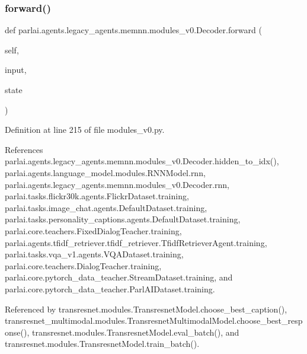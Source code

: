 \subsubsection{\texorpdfstring{forward()}{forward()}}
{\footnotesize\ttfamily def parlai.\+agents.\+legacy\+\_\+agents.\+memnn.\+modules\+\_\+v0.\+Decoder.\+forward (\begin{DoxyParamCaption}\item[{}]{self,  }\item[{}]{input,  }\item[{}]{state }\end{DoxyParamCaption})}



Definition at line 215 of file modules\+\_\+v0.\+py.



References parlai.\+agents.\+legacy\+\_\+agents.\+memnn.\+modules\+\_\+v0.\+Decoder.\+hidden\+\_\+to\+\_\+idx(), parlai.\+agents.\+language\+\_\+model.\+modules.\+R\+N\+N\+Model.\+rnn, parlai.\+agents.\+legacy\+\_\+agents.\+memnn.\+modules\+\_\+v0.\+Decoder.\+rnn, parlai.\+tasks.\+flickr30k.\+agents.\+Flickr\+Dataset.\+training, parlai.\+tasks.\+image\+\_\+chat.\+agents.\+Default\+Dataset.\+training, parlai.\+tasks.\+personality\+\_\+captions.\+agents.\+Default\+Dataset.\+training, parlai.\+core.\+teachers.\+Fixed\+Dialog\+Teacher.\+training, parlai.\+agents.\+tfidf\+\_\+retriever.\+tfidf\+\_\+retriever.\+Tfidf\+Retriever\+Agent.\+training, parlai.\+tasks.\+vqa\+\_\+v1.\+agents.\+V\+Q\+A\+Dataset.\+training, parlai.\+core.\+teachers.\+Dialog\+Teacher.\+training, parlai.\+core.\+pytorch\+\_\+data\+\_\+teacher.\+Stream\+Dataset.\+training, and parlai.\+core.\+pytorch\+\_\+data\+\_\+teacher.\+Parl\+A\+I\+Dataset.\+training.



Referenced by transresnet.\+modules.\+Transresnet\+Model.\+choose\+\_\+best\+\_\+caption(), transresnet\+\_\+multimodal.\+modules.\+Transresnet\+Multimodal\+Model.\+choose\+\_\+best\+\_\+response(), transresnet.\+modules.\+Transresnet\+Model.\+eval\+\_\+batch(), and transresnet.\+modules.\+Transresnet\+Model.\+train\+\_\+batch().

